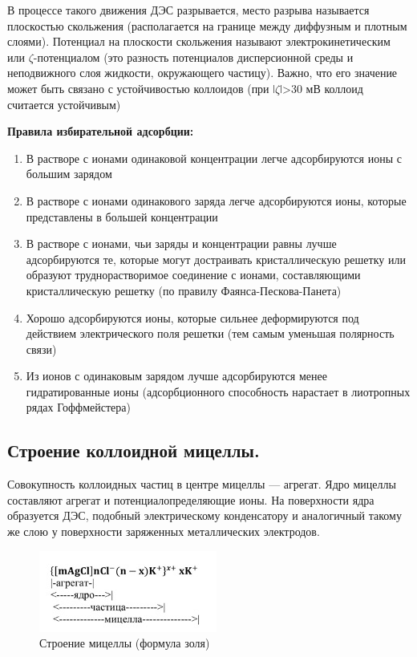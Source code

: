 \documentclass[a4paper,12pt]{article}
\begin{document}
В процессе такого движения ДЭС разрывается, место разрыва называется плоскостью скольжения (располагается на границе между диффузным и плотным слоями). Потенциал на плоскости скольжения называют электрокинетическим или $\zeta$-потенциалом (это разность потенциалов дисперсионной среды и неподвижного слоя жидкости, окружающего частицу). Важно, что его значение может быть связано с устойчивостью коллоидов (при ǀ$\zeta$ǀ>30 мВ коллоид считается устойчивым)

\textbf{Правила избирательной адсорбции:}
\begin{enumerate}
    \item В растворе с ионами одинаковой концентрации легче адсорбируются ионы с большим зарядом
    \item В растворе с ионами одинакового заряда легче адсорбируются ионы, которые представлены в большей концентрации
    \item В растворе с ионами, чьи заряды и концентрации равны лучше адсорбируются те, которые могут достраивать кристаллическую решетку или образуют труднорастворимое соединение с ионами, составляющими кристаллическую решетку (по правилу Фаянса-Пескова-Панета)
    \item Хорошо адсорбируются ионы, которые сильнее деформируются под действием электрического поля решетки (тем самым уменьшая полярность связи)
    \item Из ионов с одинаковым зарядом лучше адсорбируются менее гидратированные ионы (адсорбционного способность нарастает в лиотропных рядах Гоффмейстера)
\end{enumerate}
\subsection{Строение коллоидной мицеллы.}

Совокупность коллоидных частиц в центре мицеллы — агрегат. Ядро мицеллы составляют агрегат и потенциалопределяющие ионы. На поверхности ядра образуется ДЭС, подобный электрическому 
конденсатору и аналогичный такому же слою у поверхности заряженных металлических 
электродов. 

\begin{figure}[h!]
    \centering
    \includegraphics[scale = 1]{image.jpeg}
    \caption{Строение мицеллы (формула золя)}
    \label{fig : 2}
\end{figure}
\end{document}
